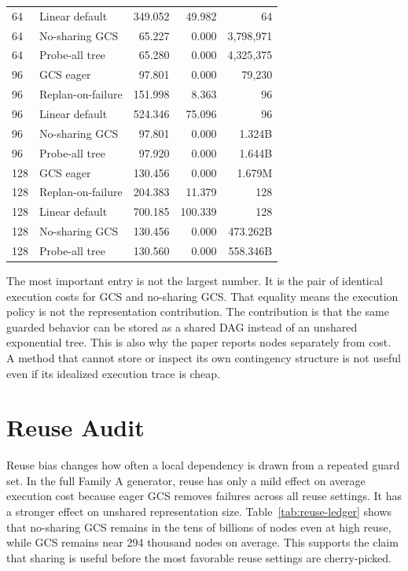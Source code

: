 \documentclass{article}
\begin{document}
\begin{table}[p]
\begin{tabular}{llrrr}
64 & Linear default & 349.052 & 49.982 & 64\\
64 & No-sharing GCS & 65.227 & 0.000 & 3{,}798{,}971\\
64 & Probe-all tree & 65.280 & 0.000 & 4{,}325{,}375\\
\midrule
96 & GCS eager & 97.801 & 0.000 & 79{,}230\\
96 & Replan-on-failure & 151.998 & 8.363 & 96\\
96 & Linear default & 524.346 & 75.096 & 96\\
96 & No-sharing GCS & 97.801 & 0.000 & 1.324B\\
96 & Probe-all tree & 97.920 & 0.000 & 1.644B\\
\midrule
128 & GCS eager & 130.456 & 0.000 & 1.679M\\
128 & Replan-on-failure & 204.383 & 11.379 & 128\\
128 & Linear default & 700.185 & 100.339 & 128\\
128 & No-sharing GCS & 130.456 & 0.000 & 473.262B\\
128 & Probe-all tree & 130.560 & 0.000 & 558.346B\\
\bottomrule
\end{tabular}
\end{table}

The most important entry is not the largest number. It is the pair of identical execution costs for GCS and no-sharing GCS. That equality means the execution policy is not the representation contribution. The contribution is that the same guarded behavior can be stored as a shared DAG instead of an unshared exponential tree. This is also why the paper reports nodes separately from cost. A method that cannot store or inspect its own contingency structure is not useful even if its idealized execution trace is cheap.

\section{Reuse Audit}
Reuse bias changes how often a local dependency is drawn from a repeated guard set. In the full Family A generator, reuse has only a mild effect on average execution cost because eager GCS removes failures across all reuse settings. It has a stronger effect on unshared representation size. Table~\ref{tab:reuse-ledger} shows that no-sharing GCS remains in the tens of billions of nodes even at high reuse, while GCS remains near 294 thousand nodes on average. This supports the claim that sharing is useful before the most favorable reuse settings are cherry-picked.
\end{document}

